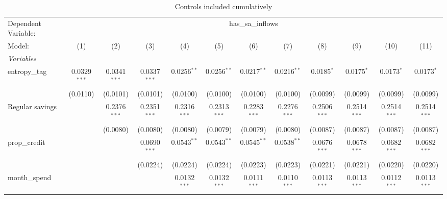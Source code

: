 
\begin{table}[htbp]
   \centering
   \caption{\label{tab:reg_csw0} Controls included cumulatively}
   \begin{tiny}
      \begin{tabular}{lccccccccccc}
         \tabularnewline\midrule\midrule
         Dependent Variable: & \multicolumn{11}{c}{has\_sa\_inflows}\\
         Model:                 & (1)            & (2)            & (3)            & (4)            & (5)            & (6)            & (7)            & (8)             & (9)             & (10)            & (11)\\
         \midrule \emph{Variables} &   &   &   &   &   &   &   &   &   &   &  \\
         entropy\_tag          & 0.0329$^{***}$ & 0.0341$^{***}$ & 0.0337$^{***}$ & 0.0256$^{**}$  & 0.0256$^{**}$  & 0.0217$^{**}$  & 0.0216$^{**}$  & 0.0185$^{*}$    & 0.0175$^{*}$    & 0.0173$^{*}$    & 0.0173$^{*}$\\
                                & (0.0110)       & (0.0101)       & (0.0101)       & (0.0100)       & (0.0100)       & (0.0100)       & (0.0100)       & (0.0099)        & (0.0099)        & (0.0099)        & (0.0099)\\
         Regular savings        &                & 0.2376$^{***}$ & 0.2351$^{***}$ & 0.2316$^{***}$ & 0.2313$^{***}$ & 0.2283$^{***}$ & 0.2276$^{***}$ & 0.2506$^{***}$  & 0.2514$^{***}$  & 0.2514$^{***}$  & 0.2514$^{***}$\\
                                &                & (0.0080)       & (0.0080)       & (0.0080)       & (0.0079)       & (0.0079)       & (0.0080)       & (0.0087)        & (0.0087)        & (0.0087)        & (0.0087)\\
         prop\_credit          &                &                & 0.0690$^{***}$ & 0.0543$^{**}$  & 0.0543$^{**}$  & 0.0545$^{**}$  & 0.0538$^{**}$  & 0.0676$^{***}$  & 0.0678$^{***}$  & 0.0682$^{***}$  & 0.0682$^{***}$\\
                                &                &                & (0.0224)       & (0.0224)       & (0.0224)       & (0.0223)       & (0.0223)       & (0.0221)        & (0.0221)        & (0.0220)        & (0.0220)\\
         month\_spend          &                &                &                & 0.0132$^{***}$ & 0.0132$^{***}$ & 0.0111$^{***}$ & 0.0110$^{***}$ & 0.0113$^{***}$  & 0.0113$^{***}$  & 0.0112$^{***}$  & 0.0113$^{***}$\\

\end{tabular}
\end{tiny}
\end{table}
